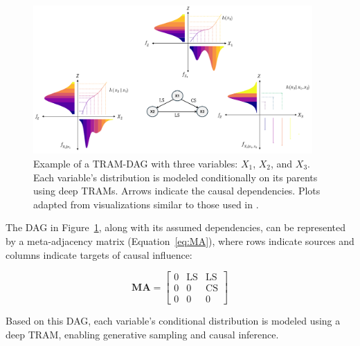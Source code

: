 \begin{figure}[H]
\centering
\includegraphics[width=0.95\textwidth]{img/tram_dag.png}
\caption{Example of a TRAM-DAG with three variables: $X_1$, $X_2$, and $X_3$. Each variable's distribution is modeled conditionally on its parents using deep TRAMs. Arrows indicate the causal dependencies. Plots adapted from visualizations similar to those used in \citet{sick2025}.}
\label{fig:tram_dag}
\end{figure}

The DAG in Figure~\ref{fig:tram_dag}, along with its assumed dependencies, can be represented by a meta-adjacency matrix (Equation~\ref{eq:MA}), where rows indicate sources and columns indicate targets of causal influence:


\begin{equation}
\mathbf{MA} =
\begin{bmatrix}
  0 & \text{LS} & \text{LS} \\
  0 & 0  & \text{CS} \\
  0 & 0  & 0
\end{bmatrix}
\label{eq:MA}
\end{equation}

Based on this DAG, each variable's conditional distribution is modeled using a deep TRAM, enabling generative sampling and causal inference. 

% 

\medskip 


